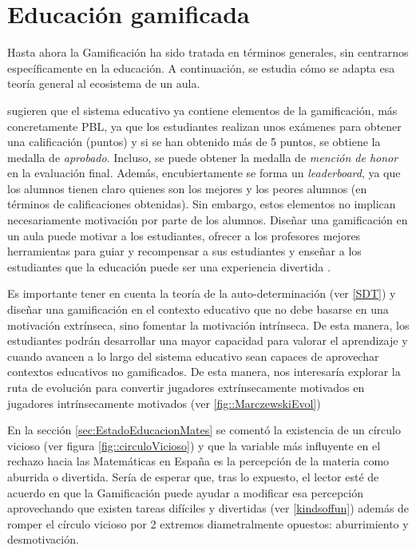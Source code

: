

\chapter{Educación gamificada}

Hasta ahora la Gamificación ha sido tratada en términos generales, sin centrarnos específicamente en la educación. 
%
A continuación, se estudia cómo se adapta esa teoría general al ecosistema de un aula.




\cite{lee2011gamification} sugieren que el sistema educativo ya contiene elementos de la gamificación, más concretamente \gls{PBL}, ya que los estudiantes realizan unos exámenes para obtener una calificación (puntos) y si se han obtenido más de 5 puntos, se obtiene la medalla de \textit{aprobado}.
%
Incluso, se puede obtener la medalla de \textit{mención de honor} en la evaluación final.
%
Además, encubiertamente se forma un \textit{leaderboard}, ya que los alumnos tienen claro quienes son los mejores y los peores alumnos (en términos de calificaciones obtenidas).
%
Sin embargo, estos elementos no implican necesariamente motivación por parte de los alumnos.
%
Diseñar una gamificación en un aula puede motivar a los estudiantes, ofrecer a los profesores mejores herramientas para guiar y recompensar a sus estudiantes y enseñar a los estudiantes que la educación puede ser una experiencia divertida  \citep{lee2011gamification}.

Es importante tener en cuenta la teoría de la auto-determinación (ver \ref{SDT}) y diseñar una gamificación en el contexto educativo que no debe basarse en una motivación extrínseca, sino fomentar la motivación intrínseca. 
%
De esta manera, los estudiantes podrán desarrollar una mayor capacidad para valorar el aprendizaje y cuando avancen a lo largo del sistema educativo sean capaces de aprovechar contextos educativos no gamificados. 
%
De esta manera, nos interesaría explorar la ruta de evolución \citep{marczewski}  para convertir jugadores extrínsecamente motivados en jugadores intrínsecamente motivados (ver \ref{fig::MarczewskiEvol})


En la sección \ref{sec:EstadoEducacionMates} se comentó la existencia de un círculo vicioso (ver figura \ref{fig::circuloVicioso}) y que la variable más influyente en el rechazo hacia las Matemáticas en España es la percepción de la materia como aburrida o divertida.
%
Sería de esperar que, tras lo expuesto, el lector esté de acuerdo en que la Gamificación puede ayudar a modificar esa percepción aprovechando que existen tareas difíciles y divertidas (ver \ref{kindsoffun}) además de romper el círculo vicioso por 2 extremos diametralmente opuestos: aburrimiento y desmotivación.

